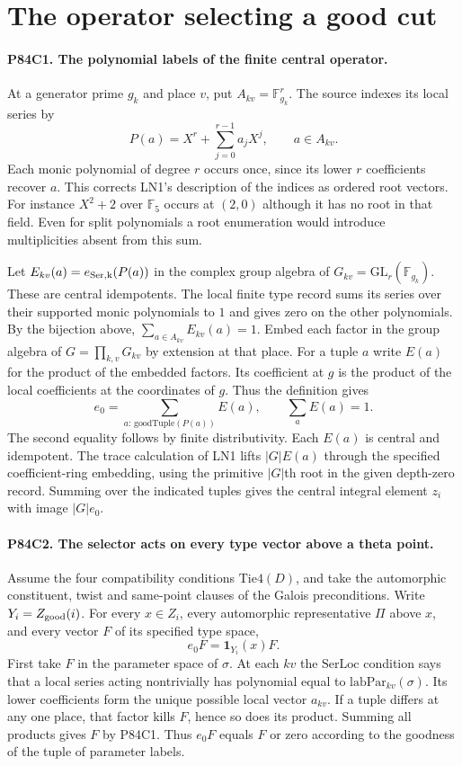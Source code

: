\section{The operator selecting a good cut}

\paragraph{P84C1. The polynomial labels of the finite central operator.}
At a generator prime $g_k$ and place $v$, put $A_{kv}=\mathbb F_{g_k}^r$.
The source indexes its local series by
\[
 P(a)=X^r+\sum_{j=0}^{r-1}a_j X^j,\qquad a\in A_{kv}.
\]
Each monic polynomial of degree $r$ occurs once, since its lower
$r$ coefficients recover $a$. This corrects LN1's description
of the indices as ordered root vectors. For instance $X^2+2$ over
$\mathbb F_5$ occurs at $(2,0)$ although it has no root in that
field. Even for split polynomials a root enumeration would introduce
multiplicities absent from this sum.

Let $E_{kv}(a)=e_{\rm Ser,k}(P(a))$ in the complex group algebra
of $G_{kv}=\mathrm{GL}_r(\mathbb F_{g_k})$. These are central
idempotents. The local finite type record sums its series over
their supported monic polynomials to $1$ and gives zero on the
other polynomials. By the bijection above,
$\sum_{a\in A_{kv}}E_{kv}(a)=1$. Embed each factor in the group
algebra of $G=\prod_{k,v}G_{kv}$ by extension at that place.
For a tuple $a$ write $E(a)$ for the product of the embedded
factors. Its coefficient at $g$ is the product of the local
coefficients at the coordinates of $g$. Thus the definition gives
\[
               e_0=\sum_{a:\,\mathrm{goodTuple}(P(a))} E(a),
                \qquad \sum_{a}E(a)=1.
\]
The second equality follows by finite distributivity. Each $E(a)$
is central and idempotent. The trace calculation of LN1 lifts
$|G|E(a)$ through the specified coefficient-ring embedding, using
the primitive $|G|$th root in the given depth-zero record. Summing
over the indicated tuples gives the central integral element $z_i$
with image $|G|e_0$.

\paragraph{P84C2. The selector acts on every type vector above a theta point.}
Assume the four compatibility conditions $\mathrm{Tie4}(D)$,
and take the automorphic constituent, twist and same-point clauses
of the Galois preconditions. Write $Y_i=Z_{\rm good}(i)$.
For every $x\in Z_i$, every automorphic representative $\Pi$
above $x$, and every vector $F$ of its specified type space,
\[
              e_0F=\mathbf 1_{Y_i}(x) F .
\]
First take $F$ in the parameter space of $\sigma$. At each $kv$
the $\mathrm{SerLoc}$ condition says that a local series acting
nontrivially has polynomial equal to $\mathrm{labPar}_{kv}(\sigma)$.
Its lower coefficients form the unique possible local vector $a_{kv}$.
If a tuple differs at any one place, that factor kills $F$, hence so
does its product. Summing all products gives $F$ by P84C1. Thus
$e_0F$ equals $F$ or zero according to the goodness of the
tuple of parameter labels.

